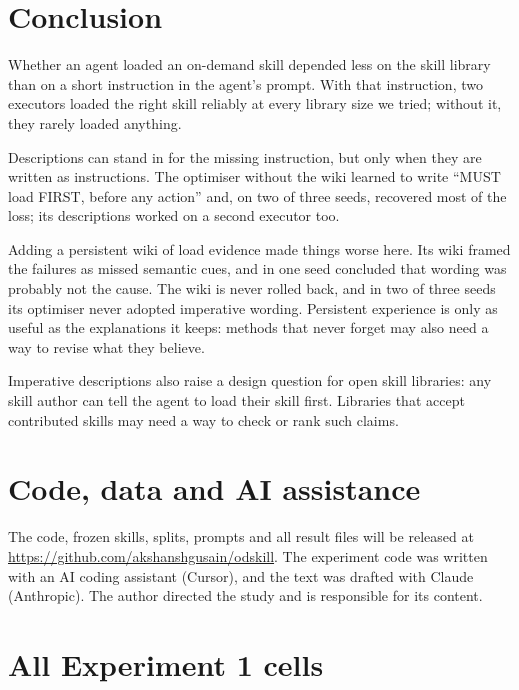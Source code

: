 \documentclass[11pt]{article}
\begin{document}
\section{Conclusion}
\label{sec:conclusion}

Whether an agent loaded an on-demand skill depended less on the skill library than on a short instruction in the agent's prompt. With that instruction, two executors loaded the right skill reliably at every library size we tried; without it, they rarely loaded anything.

Descriptions can stand in for the missing instruction, but only when they are written as instructions. The optimiser without the wiki learned to write ``MUST load FIRST, before any action'' and, on two of three seeds, recovered most of the loss; its descriptions worked on a second executor too.

Adding a persistent wiki of load evidence made things worse here. Its wiki framed the failures as missed semantic cues, and in one seed concluded that wording was probably not the cause. The wiki is never rolled back, and in two of three seeds its optimiser never adopted imperative wording. Persistent experience is only as useful as the explanations it keeps: methods that never forget may also need a way to revise what they believe.

Imperative descriptions also raise a design question for open skill libraries: any skill author can tell the agent to load their skill first. Libraries that accept contributed skills may need a way to check or rank such claims.

\section*{Code, data and AI assistance}

The code, frozen skills, splits, prompts and all result files will be released at \url{https://github.com/akshanshgusain/odskill}. The experiment code was written with an AI coding assistant (Cursor), and the text was drafted with Claude (Anthropic). The author directed the study and is responsible for its content.




\clearpage
\appendix
\section{All Experiment 1 cells}
\label{app:exp1}
\end{document}
